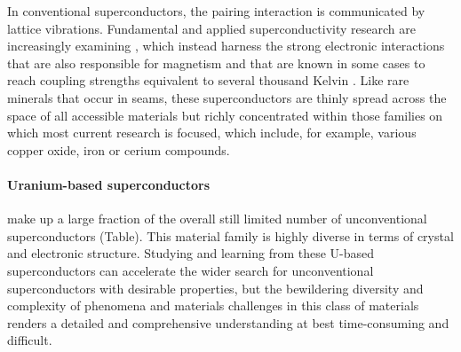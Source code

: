 In conventional superconductors, the pairing interaction is communicated by lattice vibrations. Fundamental and applied superconductivity research are increasingly examining , which instead harness the {strong electronic interactions} that are also responsible for magnetism and that are
known in some cases to reach coupling strengths equivalent to several
thousand Kelvin \cite{monthoux07,norman11}. Like rare minerals that occur in seams, these superconductors are thinly spread across the space of all accessible materials but richly concentrated within those families on which most current research is focused, which include, for example, various copper oxide, iron or cerium compounds. 



\paragraph{Uranium-based superconductors} make up a large fraction of the overall still limited number of unconventional superconductors (Table). This material family is highly diverse in terms of crystal and electronic structure. %
Studying and learning from these U-based superconductors can accelerate the wider search for unconventional superconductors with desirable properties, but the bewildering diversity and complexity of phenomena and materials challenges in this class of materials renders a detailed and comprehensive understanding at best time-consuming and difficult. 

